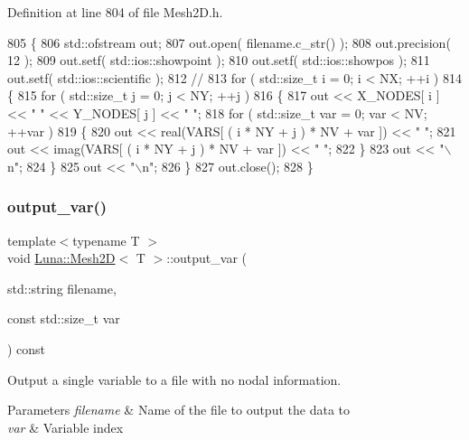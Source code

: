 Definition at line 804 of file Mesh2\+D.\+h.


\begin{DoxyCode}
805   \{
806     std::ofstream out;
807     out.open( filename.c\_str() );
808     out.precision( 12 );
809     out.setf( std::ios::showpoint );
810     out.setf( std::ios::showpos );
811     out.setf( std::ios::scientific );
812     \textcolor{comment}{//}
813     \textcolor{keywordflow}{for} ( std::size\_t i = 0; i < NX; ++i )
814     \{
815       \textcolor{keywordflow}{for} ( std::size\_t j = 0; j < NY; ++j )
816       \{
817         out << X\_NODES[ i ] << \textcolor{stringliteral}{" "} << Y\_NODES[ j ] << \textcolor{stringliteral}{" "};
818         \textcolor{keywordflow}{for} ( std::size\_t var = 0; var < NV; ++var )
819         \{
820           out << real(VARS[ ( i * NY + j ) * NV + var ]) << \textcolor{stringliteral}{" "};
821           out << imag(VARS[ ( i * NY + j ) * NV + var ]) << \textcolor{stringliteral}{" "};
822         \}
823         out << \textcolor{stringliteral}{"\(\backslash\)n"};
824       \}
825       out << \textcolor{stringliteral}{"\(\backslash\)n"};
826     \}
827     out.close();
828   \}
\end{DoxyCode}
\mbox{\label{classLuna_1_1Mesh2D_ab5fe26bc77435039388362aeab903313}} 
\subsubsection{\texorpdfstring{output\+\_\+var()}{output\_var()}}
{\footnotesize\ttfamily template$<$typename T $>$ \\
void \hyperlink{classLuna_1_1Mesh2D}{Luna\+::\+Mesh2D}$<$ T $>$\+::output\+\_\+var (\begin{DoxyParamCaption}\item[{std\+::string}]{filename,  }\item[{const std\+::size\+\_\+t}]{var }\end{DoxyParamCaption}) const}



Output a single variable to a file with no nodal information. 


\begin{DoxyParams}{Parameters}
{\em filename} & Name of the file to output the data to \\
\hline
{\em var} & Variable index \\
\hline
\end{DoxyParams}


